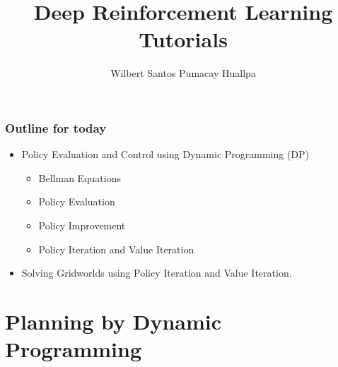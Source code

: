 \documentclass{beamer}
\title{Deep Reinforcement Learning Tutorials}
\author{Wilbert Santos Pumacay Huallpa}
\begin{document}
\begin{frame}
    \titlepage
\end{frame}

\begin{frame}
    \frametitle{Outline for today}
    \begin{itemize}
        \item Policy Evaluation and Control using Dynamic Programming (DP)
            \begin{itemize}
                \item Bellman Equations
                \item Policy Evaluation
                \item Policy Improvement
                \item Policy Iteration and Value Iteration
            \end{itemize}
        \item Solving Gridworlds using Policy Iteration and Value Iteration.
    \end{itemize}
\end{frame}

\section{Planning by Dynamic Programming}







\end{document}
